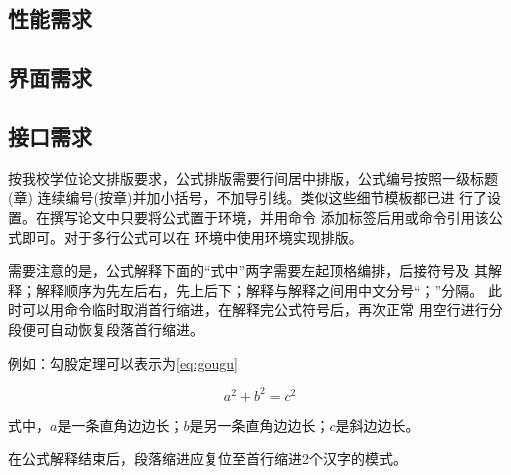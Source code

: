 \subsection{性能需求}
\subsection{界面需求}
\subsection{接口需求}

按我校学位论文排版要求，公式排版需要行间居中排版，公式编号按照一级标题(章)
连续编号(按章)并加小括号，不加导引线。类似这些细节\nwafuthesis{}模板都已进
行了设置。在撰写论文中只要将公式置于环境，并用命令
添加标签后用或命令引用该公式即可。对于多行公式可以在
环境中使用环境实现排版。

需要注意的是，公式解释下面的\enquote{式中}两字需要左起顶格编排，后接符号及
其解释；解释顺序为先左后右，先上后下；解释与解释之间用中文分号“；”分隔。
此时可以用命令临时取消首行缩进，在解释完公式符号后，再次正常
用空行进行分段便可自动恢复段落首行缩进。

例如：勾股定理可以表示为\ref{eq:gougu}

\begin{equation}
  a^2+b^2=c^2\label{eq:gougu}
\end{equation}

\noindent
式中，$a$是一条直角边边长；$b$是另一条直角边边长；$c$是斜边边长。

在公式解释结束后，段落缩进应复位至首行缩进2个汉字的模式。




